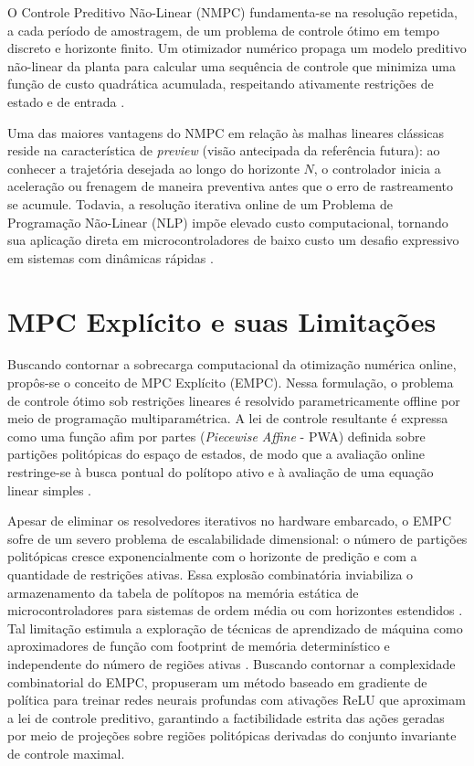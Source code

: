 O Controle Preditivo Não-Linear (NMPC) fundamenta-se na resolução repetida, a cada período de amostragem, de um problema de controle ótimo em tempo discreto e horizonte finito. Um otimizador numérico propaga um modelo preditivo não-linear da planta para calcular uma sequência de controle que minimiza uma função de custo quadrática acumulada, respeitando ativamente restrições de estado e de entrada \cite{mayne2000}.

Uma das maiores vantagens do NMPC em relação às malhas lineares clássicas reside na característica de \textit{preview} (visão antecipada da referência futura): ao conhecer a trajetória desejada ao longo do horizonte $N$, o controlador inicia a aceleração ou frenagem de maneira preventiva antes que o erro de rastreamento se acumule. Todavia, a resolução iterativa online de um Problema de Programação Não-Linear (NLP) impõe elevado custo computacional, tornando sua aplicação direta em microcontroladores de baixo custo um desafio expressivo em sistemas com dinâmicas rápidas \cite{nguyen2020}.

\section{MPC Explícito e suas Limitações}
\label{sec:fund_empc}

Buscando contornar a sobrecarga computacional da otimização numérica online, propôs-se o conceito de MPC Explícito (EMPC). Nessa formulação, o problema de controle ótimo sob restrições lineares é resolvido parametricamente offline por meio de programação multiparamétrica. A lei de controle resultante é expressa como uma função afim por partes (\textit{Piecewise Affine} - PWA) definida sobre partições politópicas do espaço de estados, de modo que a avaliação online restringe-se à busca pontual do polítopo ativo e à avaliação de uma equação linear simples \cite{bemporad2002}.

Apesar de eliminar os resolvedores iterativos no hardware embarcado, o EMPC sofre de um severo problema de escalabilidade dimensional: o número de partições politópicas cresce exponencialmente com o horizonte de predição e com a quantidade de restrições ativas. Essa explosão combinatória inviabiliza o armazenamento da tabela de polítopos na memória estática de microcontroladores para sistemas de ordem média ou com horizontes estendidos \cite{bemporad2002}. Tal limitação estimula a exploração de técnicas de aprendizado de máquina como aproximadores de função com footprint de memória determinístico e independente do número de regiões ativas \cite{karg2020}. Buscando contornar a complexidade combinatorial do EMPC,  propuseram um método baseado em gradiente de política para treinar redes neurais profundas com ativações ReLU que aproximam a lei de controle preditivo, garantindo a factibilidade estrita das ações geradas por meio de projeções sobre regiões politópicas derivadas do conjunto invariante de controle maximal.

